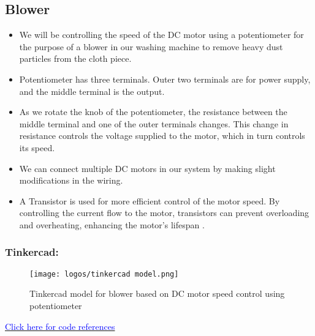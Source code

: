 \documentclass[table]{rapportCS}
\begin{document}
\subsection{Blower}\label{sec:blower}
\begin{itemize}[label=$\bullet$]
  \item We will be controlling the speed of the DC motor using a potentiometer for the purpose of a blower in our washing machine to remove heavy dust particles from the cloth piece.
  \item Potentiometer has three terminals. Outer two terminals are for power supply, and the middle terminal is the output.
  \item As we rotate the knob of the potentiometer, the resistance between the middle terminal and one of the outer terminals changes. This change in resistance controls the voltage supplied to the motor, which in turn controls its speed.
  \item We can connect multiple DC motors in our system by making slight modifications in the wiring.
  \item A Transistor is used for more efficient control of the motor speed. By controlling the current flow to the motor, transistors can prevent overloading and overheating, enhancing the motor’s lifespan .
\end{itemize}
\clearpage

\subsubsection{Tinkercad:}
\begin{figure}[h]
    \centering
    \texttt{[image: logos/tinkercad model.png]}
    \caption{Tinkercad model for blower based on DC motor speed control using potentiometer
}
    \label{fig:outlinemindmap}
\end{figure}
\hspace{1cm}\href{https://github.com/naunidhsingh03/ELP305-TribeD-Resources/blob/5ba1988fe283faba21ba7098978bb225e509d5cb/Codes/blower.ino}{\textcolor{blue}{Click here for code references}}


\clearpage
\end{document}
